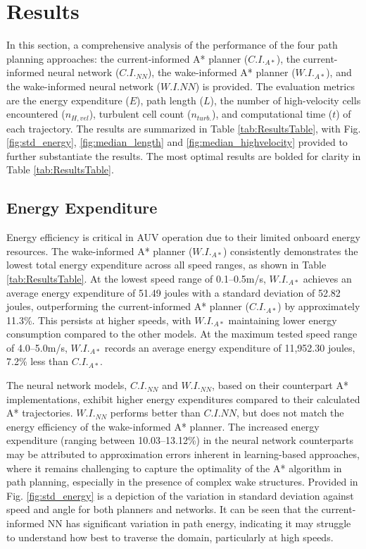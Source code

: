 \documentclass[final,5p,times,twocolumn]{elsarticle}
\begin{document}
\section{Results} %
\label{Results} %

In this section, a comprehensive analysis of the performance of the four path planning approaches: the current-informed A* planner ($C.I._{A*}$), the current-informed neural network ($C.I._{NN}$), the wake-informed A* planner ($W.I._{A*}$), and the wake-informed neural network ($W.I.{NN}$) is provided. The evaluation metrics are the energy expenditure ($E$), path length ($L$), the number of high-velocity cells encountered ($n_{H,vel}$), turbulent cell count ($n_{turb.}$), and computational time ($t$) of each trajectory. The results are summarized in Table \ref{tab:ResultsTable}, with Fig. \ref{fig:std_energy}, \ref{fig:median_length} and \ref{fig:median_highvelocity} provided to further substantiate the results. The most optimal results are bolded for clarity in Table \ref{tab:ResultsTable}.

\subsection{Energy Expenditure} %

Energy efficiency is critical in AUV operation due to their limited onboard energy resources. The wake-informed A* planner ($W.I._{A*}$) consistently demonstrates the lowest total energy expenditure across all speed ranges, as shown in Table \ref{tab:ResultsTable}. At the lowest speed range of 0.1--0.5m/s, $W.I._{A*}$ achieves an average energy expenditure of 51.49 joules with a standard deviation of 52.82 joules, outperforming the current-informed A* planner ($C.I._{A*}$) by approximately 11.3\%. This persists at higher speeds, with $W.I._{A*}$ maintaining lower energy consumption compared to the other models. At the maximum tested speed range of 4.0--5.0m/s, $W.I._{A*}$ records an average energy expenditure of 11,952.30 joules,  7.2\% less than $C.I._{A*}$.

The neural network models, $C.I._{NN}$ and $W.I._{NN}$, based on their counterpart A* implementations, exhibit higher energy expenditures compared to their calculated A* trajectories. $W.I._{NN}$ performs better than $C.I.{NN}$, but does not match the energy efficiency of the wake-informed A* planner. The increased energy expenditure (ranging between 10.03--13.12\%) in the neural network counterparts may be attributed to approximation errors inherent in learning-based approaches, where it remains challenging to capture the optimality of the A* algorithm in path planning, especially in the presence of complex wake structures. Provided in Fig. \ref{fig:std_energy} is a depiction of the variation in standard deviation against speed and angle for both planners and networks. It can be seen that the current-informed NN has significant variation in path energy, indicating it may struggle to understand how best to traverse the domain, particularly at high speeds.
\end{document}

